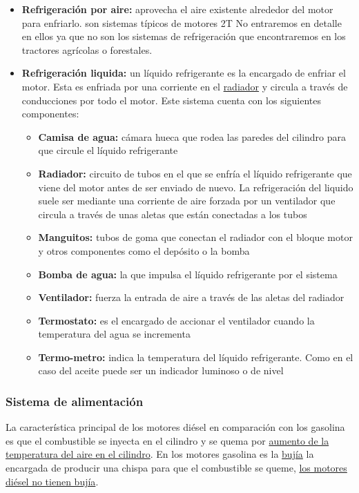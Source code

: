 \documentclass[a4paper,12pt,oneside]{article}
\begin{document}
\begin{itemize}
\item \textbf{Refrigeración por aire:} aprovecha el aire existente alrededor del motor para
enfriarlo. son sistemas típicos de motores 2T No entraremos en detalle en
ellos ya que no son los sistemas de refrigeración que encontraremos en los
tractores agrícolas o forestales.
\item \textbf{Refrigeración liquida:} un líquido refrigerante es la encargado de enfriar el
motor. Esta  es enfriada por una corriente en el \uline{radiador} y circula a través
de  conducciones por todo el motor. Este sistema cuenta con los siguientes
componentes: 
\begin{itemize}
\item \textbf{Camisa de agua:} cámara hueca que rodea las paredes del cilindro para que
circule el líquido refrigerante
\item \textbf{Radiador:} circuito de tubos en el que se enfría el líquido refrigerante
que viene del motor antes de ser enviado de nuevo. La refrigeración del
liquido suele ser mediante una corriente de aire forzada por un ventilador
que circula a través de unas aletas que están conectadas a los tubos
\item \textbf{Manguitos:} tubos de goma que conectan el radiador con el bloque motor y
otros componentes como el depósito o la bomba
\item \textbf{Bomba de agua:} la que impulsa el líquido refrigerante por el sistema
\item \textbf{Ventilador:} fuerza la entrada de aire a través de las aletas del radiador
\item \textbf{Termostato:} es el encargado de accionar el ventilador cuando la
temperatura del agua se incrementa
\item \textbf{Termo-metro:} indica la temperatura del líquido refrigerante. Como en el
caso del aceite puede ser un indicador luminoso o de nivel
\end{itemize}
\end{itemize}
\subsubsection{Sistema de alimentación}
\label{sec:orgd9f5932}
La característica principal de los motores diésel en comparación con los
gasolina es que el combustible se inyecta en el cilindro y se quema por \uline{aumento 
de la temperatura del aire en el cilindro}. En los motores gasolina es la
\uline{bujía} la encargada de producir una chispa para que el combustible se queme,
\uline{los motores diésel no tienen bujía}.
\end{document}
